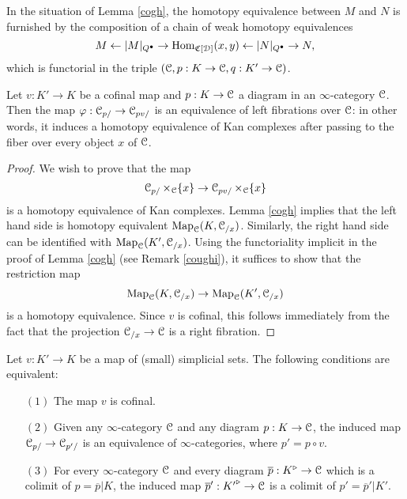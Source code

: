 \begin{remark}\label{coughi}
In the situation of Lemma \ref{cogh}, the homotopy equivalence
between $M$ and $N$ is furnished by the composition of a chain of weak homotopy
equivalences
$$ M \leftarrow |M|_{Q^{\bullet}} \rightarrow
\operatorname{Hom}_{\operatorname{\mathfrak{C}}[\operatorname{\mathcal{D}}]}(x,y) \leftarrow |N|_{Q^{\bullet}} \rightarrow
N,$$ which is functorial in the triple $(\operatorname{\mathcal{C}},p: K \rightarrow \operatorname{\mathcal{C}},q: K' \rightarrow \operatorname{\mathcal{C}})$.
\end{remark}

\begin{proposition}\label{coughing}
Let $v: K' \rightarrow K$ be a cofinal map and $p: K \rightarrow \operatorname{\mathcal{C}}$
a diagram in an $\infty$-category $\operatorname{\mathcal{C}}$. Then the map $\varphi: \operatorname{\mathcal{C}}_{p/}
\rightarrow \operatorname{\mathcal{C}}_{pv/}$ is an equivalence of left fibrations
over $\operatorname{\mathcal{C}}$: in other words, it induces a homotopy equivalence of Kan
complexes after passing to the fiber over every object $x$ of $\operatorname{\mathcal{C}}$.
\end{proposition}

\begin{proof}
We wish to prove that the map
$$ \operatorname{\mathcal{C}}_{p/} \times_{\operatorname{\mathcal{C}}} \{x\} \rightarrow \operatorname{\mathcal{C}}_{pv/} \times_{\operatorname{\mathcal{C}}} \{x\}$$
is a homotopy equivalence of Kan complexes. Lemma \ref{cogh} implies that the left
hand side is homotopy equivalent $\operatorname{{Map}}_{\operatorname{\mathcal{C}}}(K, \operatorname{\mathcal{C}}_{/x})$. Similarly, the right hand
side can be identified with $\operatorname{{Map}}_{\operatorname{\mathcal{C}}}(K', \operatorname{\mathcal{C}}_{/x})$. Using the functoriality implicit in the proof of Lemma \ref{cogh} (see Remark \ref{coughi}), it suffices to show that the restriction map
$$ \operatorname{{Map}}_{\operatorname{\mathcal{C}}}(K, \operatorname{\mathcal{C}}_{/x}) \rightarrow \operatorname{{Map}}_{\operatorname{\mathcal{C}}}(K', \operatorname{\mathcal{C}}_{/x})$$ is a homotopy equivalence. Since $v$ is cofinal, this follows immediately from the fact that the projection
$\operatorname{\mathcal{C}}_{/x} \rightarrow \operatorname{\mathcal{C}}$ is a right fibration.
\end{proof}

\begin{proposition}\label{gute}
Let $v: K' \rightarrow K$ be a map of (small) simplicial sets. The following conditions are equivalent:
\begin{itemize}
\item[$(1)$] The map $v$ is cofinal.
\item[$(2)$] Given any $\infty$-category $\operatorname{\mathcal{C}}$ and any diagram $p: K \rightarrow \operatorname{\mathcal{C}}$, the induced map $\operatorname{\mathcal{C}}_{p/} \rightarrow \operatorname{\mathcal{C}}_{p'/}$ is an equivalence of $\infty$-categories, where $p' = p \circ v$.
\item[$(3)$] For every $\infty$-category $\operatorname{\mathcal{C}}$ and every diagram $\overline{p}: K^{\triangleright} \rightarrow \operatorname{\mathcal{C}}$ which is a colimit of $p = \overline{p}|K$, the induced map $\overline{p}': {K'}^{\triangleright} \rightarrow \operatorname{\mathcal{C}}$
is a colimit of $p' = \overline{p}'|K'$.
\end{itemize}
\end{proposition}

